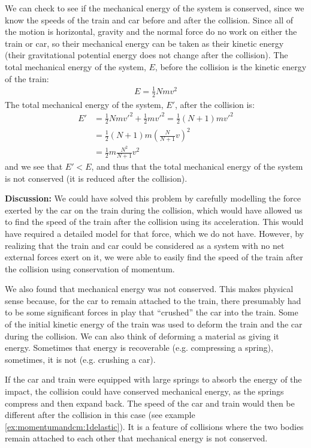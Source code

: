 \begin{example}
We can check to see if the mechanical energy of the system is conserved, since we know the speeds of the train and car before and after the collision. Since all of the motion is horizontal, gravity and the normal force do no work on either the train or car, so their mechanical energy can be taken as their kinetic energy (their gravitational potential energy does not change after the collision). The total mechanical energy of the system, $E$, before the collision is the kinetic energy of the train:
\begin{align*}
E= \frac{1}{2}Nmv^2
\end{align*}
The total mechanical energy of the system, $E'$, after the collision is:
\begin{align*}
E' &= \frac{1}{2}Nmv'^2 + \frac{1}{2}mv'^2 = \frac{1}{2}(N+1)mv'^2 \\
&=\frac{1}{2}(N+1)m \left( \frac{N}{N+1}v \right)^2\\
&=\frac{1}{2}m\frac{N^2}{N+1}v^2
\end{align*}
and we see that $E'<E$, and thus that the total mechanical energy of the system is not conserved (it is reduced after the collision).

\textbf{Discussion: }We could have solved this problem by carefully modelling the force exerted by the car on the train during the collision, which would have allowed us to find the speed of the train after the collision using its acceleration. This would have required a detailed model for that force, which we do not have. However, by realizing that the train and car could be considered as a system with no net external forces exert on it, we were able to easily find the speed of the train after the collision using conservation of momentum.

We also found that mechanical energy was not conserved. This makes physical sense because, for the car to remain attached to the train, there presumably had to be some significant forces in play that ``crushed'' the car into the train. Some of the initial kinetic energy of the train was used to deform the train and the car during the collision. We can also think of deforming a material as giving it energy. Sometimes that energy is recoverable (e.g. compressing a spring), sometimes, it is not (e.g. crushing a car).

If the car and train were equipped with large springs to absorb the energy of the impact, the collision could have conserved mechanical energy, as the springs compress and then expand back. The speed of the car and train would then be different after the collision in this case (see example \ref{ex:momentumandcm:1delastic}). It is a feature of collisions where the two bodies remain attached to each other that mechanical energy is not conserved.
\end{example}

